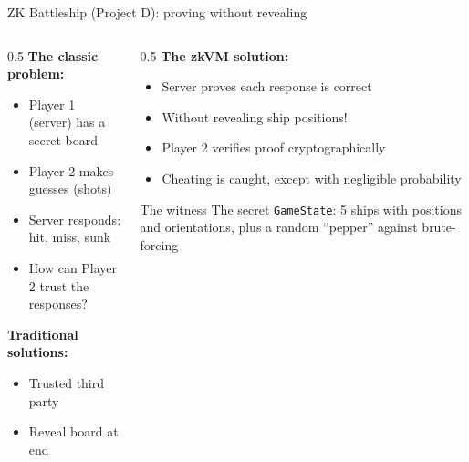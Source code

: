 \ifdefined\PRESENTATION\else\PassOptionsToClass{handout}{beamer}\fi\documentclass[aspectratio=169, lualatex]{beamer}
\begin{document}
\begin{frame}{ZK Battleship (Project D): proving without revealing}
	\begin{columns}[c]
		\begin{column}{0.5\textwidth}
			\textbf{The classic problem:}
			\begin{itemize}
				\item Player 1 (server) has a secret board
				\item Player 2 makes guesses (shots)
				\item Server responds: hit, miss, sunk
				\item How can Player 2 trust the responses?
			\end{itemize}
			\textbf{Traditional solutions:}
			\begin{itemize}
				\item Trusted third party
				\item Reveal board at end
			\end{itemize}
		\end{column}
		\begin{column}{0.5\textwidth}
			\textbf{The zkVM solution:}
			\begin{itemize}
				\item Server proves each response is correct
				\item Without revealing ship positions!
				\item Player 2 verifies proof cryptographically
				\item Cheating is caught, except with negligible probability
			\end{itemize}
			\begin{alertblock}{The witness}
				The secret \texttt{GameState}: 5 ships with positions and orientations, plus a random ``pepper'' against brute-forcing
			\end{alertblock}
		\end{column}
	\end{columns}
\end{frame}
\end{document}
